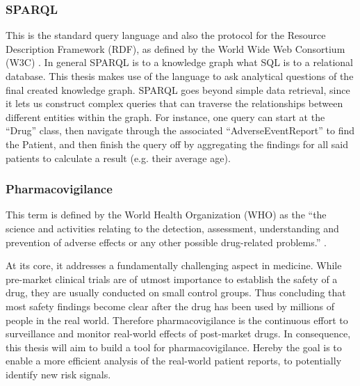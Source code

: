 \subsubsection{SPARQL}
This is the standard query language and also the protocol for the Resource Description Framework (RDF), as defined by the World Wide Web Consortium (W3C) \cite{W3C2013sparql}. In general SPARQL is to a knowledge graph what SQL is to a relational database. This thesis makes use of the language to ask analytical questions of the final created knowledge graph. SPARQL goes beyond simple data retrieval, since it lets us construct complex queries that can traverse the relationships between different entities within the graph. For instance, one query can start at the “Drug” class, then navigate through the associated “AdverseEventReport” to find the Patient, and then finish the query off by aggregating the findings for all said patients to calculate a result (e.g. their average age). 
\subsubsection{Pharmacovigilance}
This term is defined by the World Health Organization (WHO) as the “the science and activities relating to the detection, assessment, understanding and prevention of adverse effects or any other possible drug-related
problems.” \cite{WHO2002pharmacovigilance}.

At its core, it addresses a fundamentally challenging aspect in medicine. While pre-market clinical trials are of utmost importance to establish the safety of a drug, they are usually conducted on small control groups. Thus concluding that most safety findings become clear after the drug has been used by millions of people in the real world. Therefore pharmacovigilance is the continuous effort to surveillance and monitor real-world effects of post-market drugs. In consequence, this thesis will aim to build a tool for pharmacovigilance. Hereby the goal is to enable a more efficient analysis of the real-world patient reports, to potentially identify new risk signals.
